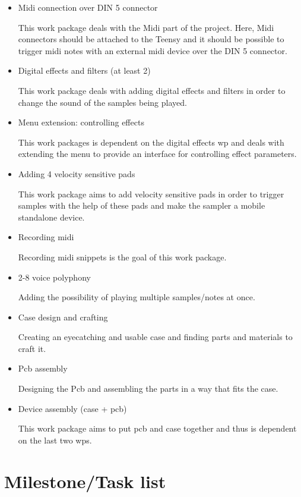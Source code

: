 \begin{itemize}
	\item Midi connection over DIN 5 connector

		This work package deals with the Midi part of the project. Here, Midi connectors
		should be attached to the Teensy and it should be possible to trigger midi notes
		with an external midi device over the DIN 5 connector.

	\item Digital effects and filters (at least 2)

		This work package deals with adding digital effects and filters in order to
		change the sound of the samples being played.

	\item Menu extension: controlling effects

		This work packages is dependent on the digital effects wp and deals with extending
		the menu to provide an interface for controlling effect parameters.

	\item Adding 4 velocity sensitive pads

		This work package aims to add velocity sensitive pads in order to trigger samples with
		the help of these pads and make the sampler a mobile standalone device.

	\item Recording midi

		Recording midi snippets is the goal of this work package.

	\item 2-8 voice polyphony

		Adding the possibility of playing multiple samples/notes at once.
		
	\item Case design and crafting

		Creating an eyecatching and usable case and finding parts and materials to craft it.

	\item Pcb assembly

		Designing the Pcb and assembling the parts in a way that fits the case.

	\item Device assembly (case + pcb)

		This work package aims to put pcb and case together and thus is dependent on the last two wps.
\end{itemize}



\section{Milestone/Task list}

